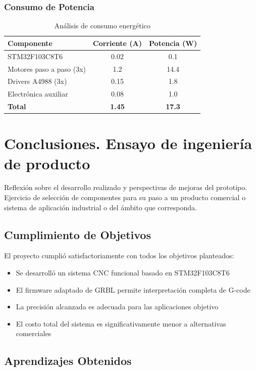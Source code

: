 \documentclass[12pt]{article}
\begin{document}
\subsubsection{Consumo de Potencia}

\begin{table}[H]
\centering
\caption{Análisis de consumo energético}
\label{tab:consumo}
\begin{tabular}{|l|c|c|}
\hline
\textbf{Componente} & \textbf{Corriente (A)} & \textbf{Potencia (W)} \\
\hline
STM32F103C8T6 & 0.02 & 0.1 \\
Motores paso a paso (3x) & 1.2 & 14.4 \\
Drivers A4988 (3x) & 0.15 & 1.8 \\
Electrónica auxiliar & 0.08 & 1.0 \\
\hline
\textbf{Total} & \textbf{1.45} & \textbf{17.3} \\
\hline
\end{tabular}
\end{table}

\section{Conclusiones. Ensayo de ingeniería de producto}
Reflexión sobre el desarrollo realizado y perspectivas de mejoras del prototipo.  
Ejercicio de selección de componentes para su paso a un producto comercial o sistema de aplicación industrial o del ámbito que corresponda.

\subsection{Cumplimiento de Objetivos}

El proyecto cumplió satisfactoriamente con todos los objetivos planteados:

\begin{itemize}
    \item Se desarrolló un sistema CNC funcional basado en STM32F103C8T6
    \item El firmware adaptado de GRBL permite interpretación completa de G-code
    \item La precisión alcanzada es adecuada para las aplicaciones objetivo
    \item El costo total del sistema es significativamente menor a alternativas comerciales
\end{itemize}

\subsection{Aprendizajes Obtenidos}
\end{document}
